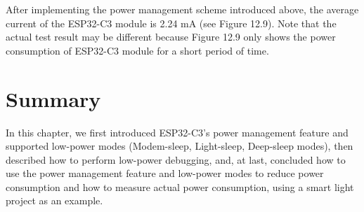 \documentclass[a4paper,12pt]{book}
\begin{document}
After implementing the power management scheme introduced above, the average current of the ESP32-C3 module is 2.24 mA (see Figure 12.9). Note that the actual test result may be different because Figure 12.9 only shows the power consumption of ESP32-C3 module for a short period of time.

\section{Summary}
In this chapter, we first introduced ESP32-C3’s power management feature and supported low-power modes (Modem-sleep, Light-sleep, Deep-sleep modes), then described how to perform low-power debugging, and, at last, concluded how to use the power management feature and low-power modes to reduce power consumption and how to measure actual power consumption, using a smart light project as an example.
\end{document}

